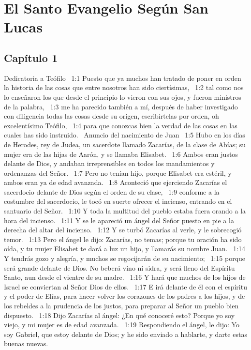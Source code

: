 \chapter{El Santo Evangelio Según San Lucas}

\section*{Capítulo 1}
Dedicatoria a Teófilo  
1:1 Puesto que ya muchos han tratado de poner en orden la historia de las cosas que entre nosotros han sido ciertísimas,  
1:2 tal como nos lo enseñaron los que desde el principio lo vieron con sus ojos, y fueron ministros de la palabra,  
1:3 me ha parecido también a mí, después de haber investigado con diligencia todas las cosas desde su origen, escribírtelas por orden, oh excelentísimo Teófilo,  
1:4 para que conozcas bien la verdad de las cosas en las cuales has sido instruido.  
Anuncio del nacimiento de Juan  
1:5 Hubo en los días de Herodes, rey de Judea, un sacerdote llamado Zacarías, de la clase de Abías; su mujer era de las hijas de Aarón, y se llamaba Elisabet.  
1:6 Ambos eran justos delante de Dios, y andaban irreprensibles en todos los mandamientos y ordenanzas del Señor.  
1:7 Pero no tenían hijo, porque Elisabet era estéril, y ambos eran ya de edad avanzada.  
1:8 Aconteció que ejerciendo Zacarías el sacerdocio delante de Dios según el orden de su clase,  
1:9 conforme a la costumbre del sacerdocio, le tocó en suerte ofrecer el incienso, entrando en el santuario del Señor.  
1:10 Y toda la multitud del pueblo estaba fuera orando a la hora del incienso.  
1:11 Y se le apareció un ángel del Señor puesto en pie a la derecha del altar del incienso.  
1:12 Y se turbó Zacarías al verle, y le sobrecogió temor.  
1:13 Pero el ángel le dijo: Zacarías, no temas; porque tu oración ha sido oída, y tu mujer Elisabet te dará a luz un hijo, y llamarás su nombre Juan.  
1:14 Y tendrás gozo y alegría, y muchos se regocijarán de su nacimiento;  
1:15 porque será grande delante de Dios. No beberá vino ni sidra, y será lleno del Espíritu Santo, aun desde el vientre de su madre.  
1:16 Y hará que muchos de los hijos de Israel se conviertan al Señor Dios de ellos.  
1:17 E irá delante de él con el espíritu y el poder de Elías, para hacer volver los corazones de los padres a los hijos, y de los rebeldes a la prudencia de los justos, para preparar al Señor un pueblo bien dispuesto.  
1:18 Dijo Zacarías al ángel: ¿En qué conoceré esto? Porque yo soy viejo, y mi mujer es de edad avanzada.  
1:19 Respondiendo el ángel, le dijo: Yo soy Gabriel, que estoy delante de Dios; y he sido enviado a hablarte, y darte estas buenas nuevas.  
